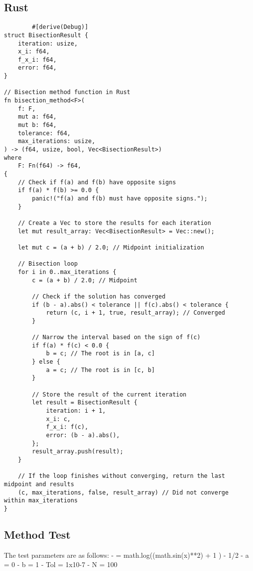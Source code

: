 \documentclass{article}
\begin{document}
    \subsection{Rust}
    \begin{verbatim}
        #[derive(Debug)]
struct BisectionResult {
    iteration: usize,
    x_i: f64,
    f_x_i: f64,
    error: f64,
}

// Bisection method function in Rust
fn bisection_method<F>(
    f: F,
    mut a: f64,
    mut b: f64,
    tolerance: f64,
    max_iterations: usize,
) -> (f64, usize, bool, Vec<BisectionResult>)
where
    F: Fn(f64) -> f64,
{
    // Check if f(a) and f(b) have opposite signs
    if f(a) * f(b) >= 0.0 {
        panic!("f(a) and f(b) must have opposite signs.");
    }

    // Create a Vec to store the results for each iteration
    let mut result_array: Vec<BisectionResult> = Vec::new();

    let mut c = (a + b) / 2.0; // Midpoint initialization

    // Bisection loop
    for i in 0..max_iterations {
        c = (a + b) / 2.0; // Midpoint

        // Check if the solution has converged
        if (b - a).abs() < tolerance || f(c).abs() < tolerance {
            return (c, i + 1, true, result_array); // Converged
        }

        // Narrow the interval based on the sign of f(c)
        if f(a) * f(c) < 0.0 {
            b = c; // The root is in [a, c]
        } else {
            a = c; // The root is in [c, b]
        }

        // Store the result of the current iteration
        let result = BisectionResult {
            iteration: i + 1,
            x_i: c,
            f_x_i: f(c),
            error: (b - a).abs(),
        };
        result_array.push(result);
    }

    // If the loop finishes without converging, return the last midpoint and results
    (c, max_iterations, false, result_array) // Did not converge within max_iterations
}
    \end{verbatim}

\subsection{Method Test}\label{subsec:method-test}
The test parameters are as follows:
        - \textflorin = math.log((math.sin(x)**2) + 1 ) - 1/2
        - a = 0
        - b = 1
        - Tol = 1x10-7
        - N = 100
\end{document}
